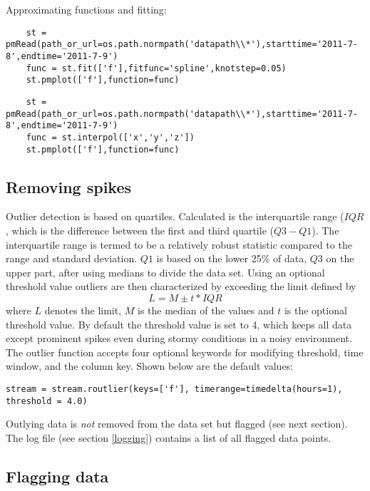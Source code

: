 Approximating functions and fitting:
\begin{verbatim}
    st = pmRead(path_or_url=os.path.normpath('datapath\\*'),starttime='2011-7-8',endtime='2011-7-9')
    func = st.fit(['f'],fitfunc='spline',knotstep=0.05)
    st.pmplot(['f'],function=func)
\end{verbatim}

\begin{verbatim}
    st = pmRead(path_or_url=os.path.normpath('datapath\\*'),starttime='2011-7-8',endtime='2011-7-9')
    func = st.interpol(['x','y','z'])
    st.pmplot(['f'],function=func)
\end{verbatim}

\subsection{Removing spikes}

Outlier detection is based on quartiles. Calculated is the interquartile range ($IQR$, which is the difference between the first and third quartile ($Q3 - Q1$). The interquartile range is termed to be a relatively robust statistic compared to the range and standard deviation. $Q1$ is based on the lower 25\% of data, $Q3$ on the upper part, after using medians to divide the data set. Using an optional threshold value outliers are then characterized by exceeding the limit defined by
\begin{equation}\label{outlier}
    L = M \pm t*IQR
\end{equation}
where $L$ denotes the limit, $M$ is the median of the values and $t$ is the optional threshold value. By default the threshold value is set to 4, which keeps all data except prominent spikes even during stormy conditions in a noisy environment. The outlier function accepts four optional keywords for modifying threshold, time window, and the column key. Shown below are the default values:
\begin{verbatim}
stream = stream.routlier(keys=['f'], timerange=timedelta(hours=1), threshold = 4.0)
\end{verbatim}
Outlying data is \emph{not} removed from the data set but flagged (see next section). The log file (see section \ref{logging}) contains a list of all flagged data points.

\subsection{Flagging data}\label{flagging}

